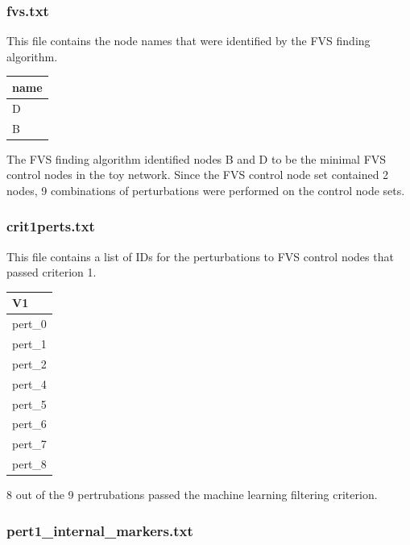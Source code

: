 \documentclass[
]{book}
\begin{document}
\hypertarget{section-id}{%
\subsubsection*{fvs.txt}\label{section-id}}

This file contains the node names that were identified by the FVS finding algorithm.

\begin{tabular}{l}
\hline
name\\
\hline
D\\
\hline
B\\
\hline
\end{tabular}

The FVS finding algorithm identified nodes B and D to be the minimal FVS control nodes in the toy network. Since the FVS control node set contained 2 nodes, 9 combinations of perturbations were performed on the control node sets.

\hypertarget{section-id}{%
\subsubsection*{crit1perts.txt}\label{section-id}}

This file contains a list of IDs for the perturbations to FVS control nodes that passed criterion 1.

\begin{tabular}{l}
\hline
V1\\
\hline
pert\_0\\
\hline
pert\_1\\
\hline
pert\_2\\
\hline
pert\_4\\
\hline
pert\_5\\
\hline
pert\_6\\
\hline
pert\_7\\
\hline
pert\_8\\
\hline
\end{tabular}

8 out of the 9 pertrubations passed the machine learning filtering criterion.

\hypertarget{section-id}{%
\subsubsection*{pert1\_internal\_markers.txt}\label{section-id}}
\end{document}
